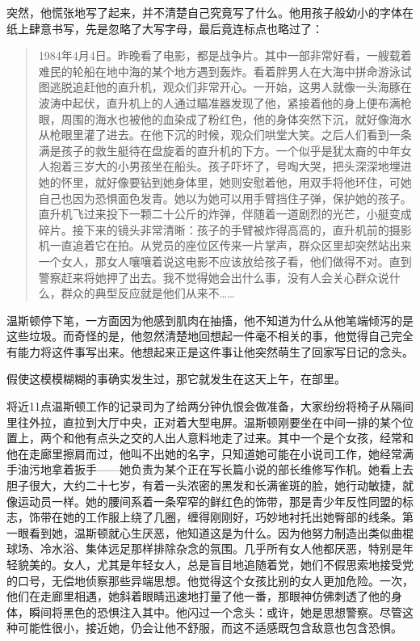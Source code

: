 突然，他慌张地写了起来，并不清楚自己究竟写了什么。他用孩子般幼小的字体在纸上肆意书写，先是忽略了大写字母，最后竟连标点也略过了：

\begin{quotation}
1984年4月4日。昨晚看了电影，都是战争片。其中一部非常好看，一艘载着难民的轮船在地中海的某个地方遇到轰炸。看着胖男人在大海中拼命游泳试图逃脱追赶他的直升机，观众们非常开心。一开始，这男人就像一头海豚在波涛中起伏，直升机上的人通过瞄准器发现了他，紧接着他的身上便布满枪眼，周围的海水也被他的血染成了粉红色，他的身体突然下沉，就好像海水从枪眼里灌了进去。在他下沉的时候，观众们哄堂大笑。之后人们看到一条满是孩子的救生艇待在盘旋着的直升机的下方。一个似乎是犹太裔的中年女人抱着三岁大的小男孩坐在船头。孩子吓坏了，号啕大哭，把头深深地埋进她的怀里，就好像要钻到她身体里，她则安慰着他，用双手将他环住，可她自己也因为恐惧面色发青。她以为她可以用手臂挡住子弹，保护她的孩子。直升机飞过来投下一颗二十公斤的炸弹，伴随着一道剧烈的光芒，小艇变成碎片。接下来的镜头非常清晰：孩子的手臂被炸得高高的，直升机前的摄影机一直追着它在拍。从党员的座位区传来一片掌声，群众区里却突然站出来一个女人，那女人嚷嚷着说这电影不应该放给孩子看，他们做得不对。直到警察赶来将她押了出去。我不觉得她会出什么事，没有人会关心群众说什么，群众的典型反应就是他们从来不\ldots\ldots{}
\end{quotation}

温斯顿停下笔，一方面因为他感到肌肉在抽搐，他不知道为什么从他笔端倾泻的是这些垃圾。而奇怪的是，他忽然清楚地回想起一件毫不相关的事，他觉得自己完全有能力将这件事写出来。他想起来正是这件事让他突然萌生了回家写日记的念头。

假使这模模糊糊的事确实发生过，那它就发生在这天上午，在部里。

将近11点温斯顿工作的记录司为了给两分钟仇恨会做准备，大家纷纷将椅子从隔间里往外拉，直拉到大厅中央，正对着大型电屏。温斯顿刚要坐在中间一排的某个位置上，两个和他有点头之交的人出人意料地走了过来。其中一个是个女孩，经常和他在走廊里擦肩而过，他叫不出她的名字，只知道她可能在小说司工作，她经常满手油污地拿着扳手——她负责为某个正在写长篇小说的部长维修写作机。她看上去胆子很大，大约二十七岁，有着一头浓密的黑发和长满雀斑的脸，她行动敏捷，就像运动员一样。她的腰间系着一条窄窄的鲜红色的饰带，那是青少年反性同盟的标志，饰带在她的工作服上绕了几圈，缠得刚刚好，巧妙地衬托出她臀部的线条。第一眼看到她，温斯顿就心生厌恶，他知道这是为什么。因为他努力制造出类似曲棍球场、冷水浴、集体远足那样排除杂念的氛围。几乎所有女人他都厌恶，特别是年轻貌美的。女人，尤其是年轻女人，总是盲目地追随着党，她们不假思索地接受党的口号，无偿地侦察那些异端思想。他觉得这个女孩比别的女人更加危险。一次，他们在走廊里相遇，她斜着眼睛迅速地打量了他一番，那眼神仿佛刺透了他的身体，瞬间将黑色的恐惧注入其中。他闪过一个念头：或许，她是思想警察。尽管这种可能性很小，接近她，仍会让他不舒服，而这不适感既包含敌意也包含恐惧。

